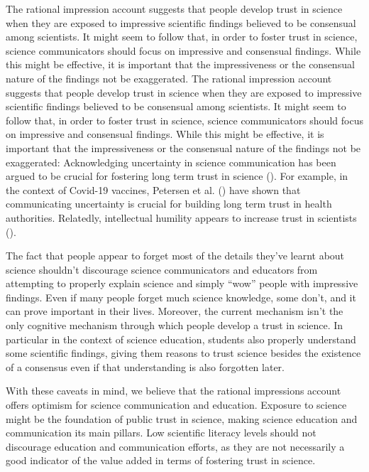 \documentclass[
  jou,
  floatsintext,
  longtable,
  nolmodern,
  notxfonts,
  notimes,
  colorlinks=true,linkcolor=blue,citecolor=blue,urlcolor=blue]{apa7}
\begin{document}
The rational impression account suggests that people develop trust in
science when they are exposed to impressive scientific findings believed
to be consensual among scientists. It might seem to follow that, in
order to foster trust in science, science communicators should focus on
impressive and consensual findings. While this might be effective, it is
important that the impressiveness or the consensual nature of the
findings not be exaggerated. The rational impression account suggests
that people develop trust in science when they are exposed to impressive
scientific findings believed to be consensual among scientists. It might
seem to follow that, in order to foster trust in science, science
communicators should focus on impressive and consensual findings. While
this might be effective, it is important that the impressiveness or the
consensual nature of the findings not be exaggerated: Acknowledging
uncertainty in science communication has been argued to be crucial for
fostering long term trust in science
(). For example, in the context of Covid-19 vaccines, Petersen et
al. ()
have shown that communicating uncertainty is crucial for building long
term trust in health authorities. Relatedly, intellectual humility
appears to increase trust in scientists
().

The fact that people appear to forget most of the details they've learnt
about science shouldn't discourage science communicators and educators
from attempting to properly explain science and simply ``wow'' people
with impressive findings. Even if many people forget much science
knowledge, some don't, and it can prove important in their lives.
Moreover, the current mechanism isn't the only cognitive mechanism
through which people develop a trust in science. In particular in the
context of science education, students also properly understand some
scientific findings, giving them reasons to trust science besides the
existence of a consensus even if that understanding is also forgotten
later.

With these caveats in mind, we believe that the rational impressions
account offers optimism for science communication and education.
Exposure to science might be the foundation of public trust in science,
making science education and communication its main pillars. Low
scientific literacy levels should not discourage education and
communication efforts, as they are not necessarily a good indicator of
the value added in terms of fostering trust in science.
\end{document}
